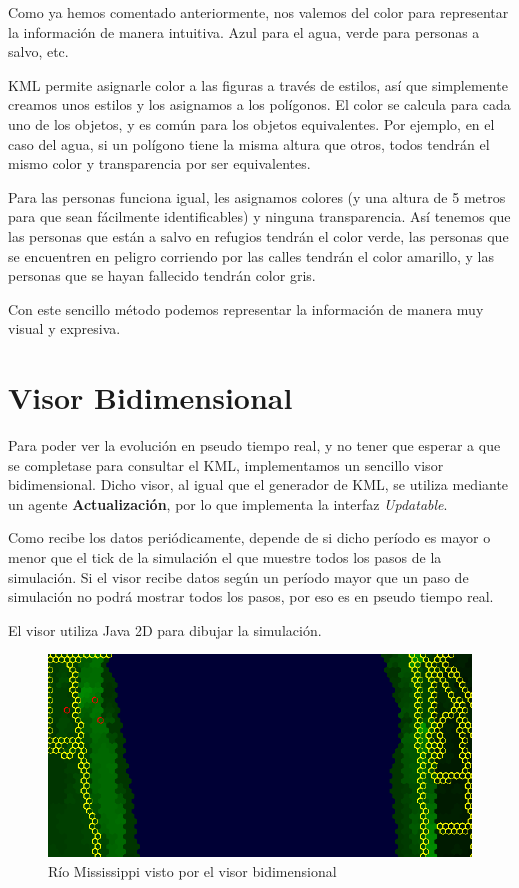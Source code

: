 Como ya hemos comentado anteriormente, nos valemos del color para representar
la información de manera intuitiva. Azul para el agua, verde para personas a
salvo, etc.

KML permite asignarle color a las figuras a través de estilos, así que
simplemente creamos unos estilos y los asignamos a los polígonos. El color se
calcula para cada uno de los objetos, y es común para los objetos equivalentes.
Por ejemplo, en el caso del agua, si un polígono tiene la misma altura que
otros, todos tendrán el mismo color y transparencia por ser equivalentes.

Para las personas funciona igual, les asignamos colores (y una altura de 5
metros para que sean fácilmente identificables) y ninguna transparencia. Así
tenemos que las personas que están a salvo en refugios tendrán el color verde,
las personas que se encuentren en peligro corriendo por las calles tendrán el
color amarillo, y las personas que se hayan fallecido tendrán color gris.

Con este sencillo método podemos representar la información de manera muy
visual y expresiva.

\section*{Visor Bidimensional}

Para poder ver la evolución en pseudo tiempo real, y no tener que esperar a que
se completase para consultar el KML, implementamos un sencillo visor
bidimensional. Dicho visor, al igual que el generador de KML, se utiliza
mediante un agente {\bf Actualización}, por lo que implementa la interfaz {\em
Updatable}.

Como recibe los datos periódicamente, depende de si dicho período es mayor o
menor que el tick de la simulación el que muestre todos los pasos de la
simulación. Si el visor recibe datos según un período mayor que un paso de
simulación no podrá mostrar todos los pasos, por eso es en pseudo tiempo real.

El visor utiliza Java 2D para dibujar la simulación.

\begin{figure}[H]
 \centering
 \includegraphics[width=120mm]{figuras/cap5/visor.png}
 \caption{Río Mississippi visto por el visor bidimensional}
\end{figure}


